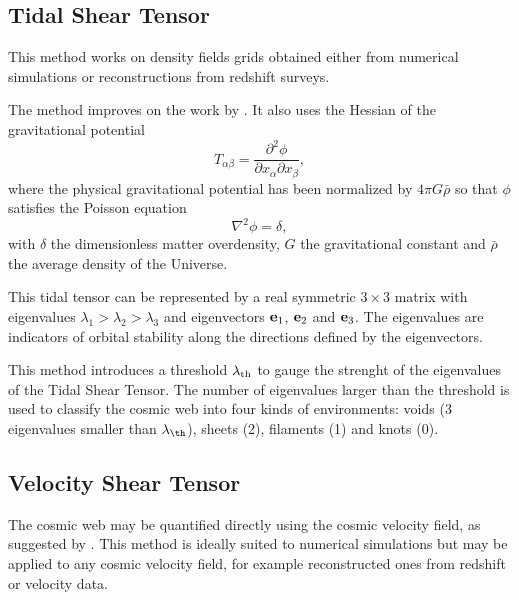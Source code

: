 \subsection{Tidal Shear Tensor}
\label{section:forero-romero}

This method \cite{2009MNRAS.396.1815F} works on density fields grids
obtained either from numerical simulations  or reconstructions from
redshift surveys. 

The method improves on the work by \citep{2007MNRAS.375..489H}. It
also  uses the Hessian of the gravitational potential 
\begin{equation}
T_{\alpha\beta} = \frac{\partial^2\phi}{\partial x_\alpha\partial x_\beta},
\end{equation}
%
where the physical gravitational potential has been normalized by
$4\pi G\bar{\rho}$ so that $\phi$ satisfies the Poisson
equation
\begin{equation}
\nabla^2\phi=\delta,
\end{equation}
%
with $\delta$ the dimensionless matter overdensity, $G$ the
gravitational constant and $\bar{\rho}$ the average density of the
Universe.

This tidal tensor can be represented by a real symmetric $3\times 3$
matrix with eigenvalues $\lambda_1>\lambda_2>\lambda_3$ and
eigenvectors ${\bf e}_1$, ${\bf e}_2$ and ${\bf e}_3$. The eigenvalues
are indicators of orbital stability along the directions defined by
the eigenvectors. 

This method introduces a threshold $\lambda_{\rm th}$ to gauge the
strenght of the eigenvalues of the Tidal Shear Tensor. The number of
eigenvalues larger than the threshold is used to classify the cosmic
web into four kinds of environments: voids (3 eigenvalues smaller than
$\lambda_{\th}$), sheets (2), filaments (1) and knots (0).






\subsection{Velocity Shear Tensor}
\label{section:libeskind}
The cosmic web may be quantified directly using the cosmic velocity field, as suggested by \cite{2012MNRAS.425.2049H}. This method is ideally suited to numerical simulations but may be applied to any cosmic velocity field, for example reconstructed ones from redshift or velocity data.

